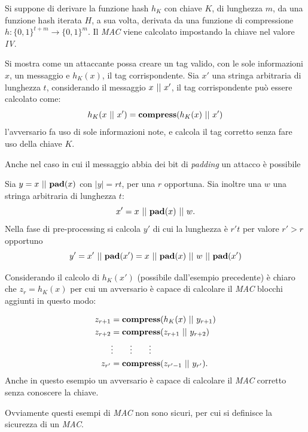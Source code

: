 \begin{example}
    \label{atk:extension}
    Si suppone di derivare la funzione hash $h_K$ con chiave $K$, di lunghezza $m$, da una funzione hash iterata $H$, a sua volta, derivata da una funzione di compressione $h: \{0,1\}^{t+m} \to \{0,1\}^{m}$. Il \textit{MAC} viene calcolato impostando la chiave nel valore \emph{IV}.   

    \noindent Si mostra come un attaccante possa creare un tag valido, con le sole informazioni $x$, un messaggio e $h_K(x)$, il tag corrispondente. Sia $x'$ una stringa arbitraria di lunghezza $t$, considerando il messaggio $x \operatorname{\,||\,} x'$, il tag corrispondente può essere calcolato come:
    \[
        h_K(x\operatorname{\,||\,} x') = \textbf{compress}(h_K(x) \operatorname{\,||\,} x')
    \]
    l'avversario fa uso di sole informazioni note, e calcola il tag corretto senza fare uso della chiave $K$.
\end{example}
Anche nel caso in cui il messaggio abbia dei bit di \textit{padding} un attacco è possibile
\begin{example}
    Sia $y = x \operatorname{\,||\,} \textbf{pad}(x)$ con $|y| = rt$, per una $r$ opportuna. Sia inoltre una $w$ una stringa arbitraria di lunghezza $t$:
    \[
        x' = x \operatorname{\,||\,} \textbf{pad}(x) \operatorname{\,||\,} w.
    \]
    Nella fase di pre-processing si calcola $y'$ di cui la lunghezza è $r't$ per valore $r'>r$ opportuno
    \[
        y' = x' \operatorname{\,||\,} \textbf{pad}(x') = x \operatorname{\,||\,} \textbf{pad}(x) \operatorname{\,||\,} w \operatorname{\,||\,} \textbf{pad}(x')
    \]

    Considerando il calcolo di $h_K(x')$ (possibile dall'esempio precedente) è chiaro che $z_r = h_K(x)$ per cui un avversario è capace di calcolare il \textit{MAC} blocchi aggiunti in questo modo:

    \begin{align*}
        z_{r+1} &= \textbf{compress}(h_K(x) \operatorname{\,||\,} y_{r+1})\\
        z_{r+2} &= \textbf{compress}(z_{r+1} \operatorname{\,||\,} y_{r+2})\\
        &\vdots \qquad \vdots \qquad \vdots \\
        z_{r'} &= \textbf{compress}(z_{r'-1} \operatorname{\,||\,} y_{r'}).
    \end{align*}
    Anche in questo esempio un avversario è capace di calcolare il \emph{MAC} corretto senza conoscere la chiave.
\end{example}

\vspace{1em}
Ovviamente questi esempi di \emph{MAC} non sono sicuri, per cui si definisce la sicurezza di un \emph{MAC}.

